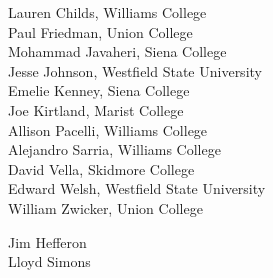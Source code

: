 \documentclass{hrumc}
\begin{document}
{\setlength{\parskip}{1.5ex}
\setlength{\parindent}{0ex}

\vspace{2ex plus 1fil}

\vspace{2ex plus 1fil}
\begin{minipage}{\textwidth}
  \begin{hrumcsteering}
  Lauren Childs, Williams College        \\
  Paul Friedman, Union College           \\
  Mohammad Javaheri, Siena College       \\
  Jesse Johnson, Westfield State University \\
  Emelie Kenney, Siena College           \\
  Joe Kirtland, Marist College           \\
  Allison Pacelli, Williams College      \\
  Alejandro Sarria, Williams College     \\
  David Vella, Skidmore College          \\
  Edward Welsh, Westfield State University \\
  William Zwicker, Union College
  \end{hrumcsteering}
  \hspace{5em plus 1fill}
  \begin{localsteering}
  Jim Hef{}feron \\
  Lloyd Simons  
  \end{localsteering}
\end{minipage}
}
\clearpage
\end{document}
